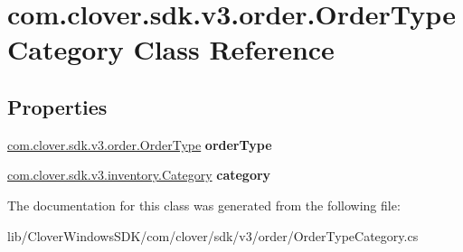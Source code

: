 \hypertarget{classcom_1_1clover_1_1sdk_1_1v3_1_1order_1_1_order_type_category}{}\section{com.\+clover.\+sdk.\+v3.\+order.\+Order\+Type\+Category Class Reference}
\label{classcom_1_1clover_1_1sdk_1_1v3_1_1order_1_1_order_type_category}
\subsection*{Properties}
\begin{DoxyCompactItemize}
\item 
\mbox{\label{classcom_1_1clover_1_1sdk_1_1v3_1_1order_1_1_order_type_category_a70c6c9677782416203ee5eba23ecd029}} 
\hyperlink{classcom_1_1clover_1_1sdk_1_1v3_1_1order_1_1_order_type}{com.\+clover.\+sdk.\+v3.\+order.\+Order\+Type} {\bfseries order\+Type}
\item 
\mbox{\label{classcom_1_1clover_1_1sdk_1_1v3_1_1order_1_1_order_type_category_a9c9a3ce76a7527c0ff1a51cb9f48518c}} 
\hyperlink{classcom_1_1clover_1_1sdk_1_1v3_1_1inventory_1_1_category}{com.\+clover.\+sdk.\+v3.\+inventory.\+Category} {\bfseries category}
\end{DoxyCompactItemize}


The documentation for this class was generated from the following file\+:\begin{DoxyCompactItemize}
\item 
lib/\+Clover\+Windows\+S\+D\+K/com/clover/sdk/v3/order/Order\+Type\+Category.\+cs\end{DoxyCompactItemize}
